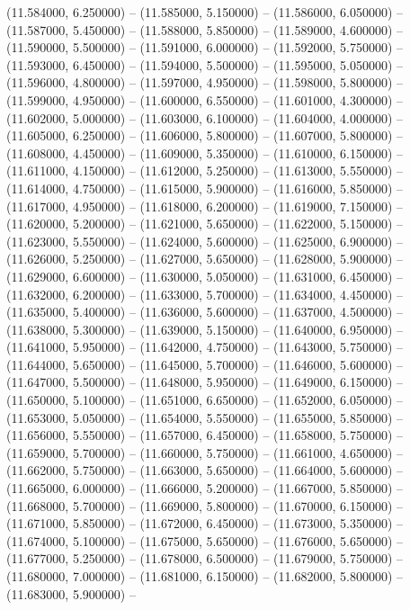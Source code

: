 (11.584000, 6.250000) -- 
(11.585000, 5.150000) -- 
(11.586000, 6.050000) -- 
(11.587000, 5.450000) -- 
(11.588000, 5.850000) -- 
(11.589000, 4.600000) -- 
(11.590000, 5.500000) -- 
(11.591000, 6.000000) -- 
(11.592000, 5.750000) -- 
(11.593000, 6.450000) -- 
(11.594000, 5.500000) -- 
(11.595000, 5.050000) -- 
(11.596000, 4.800000) -- 
(11.597000, 4.950000) -- 
(11.598000, 5.800000) -- 
(11.599000, 4.950000) -- 
(11.600000, 6.550000) -- 
(11.601000, 4.300000) -- 
(11.602000, 5.000000) -- 
(11.603000, 6.100000) -- 
(11.604000, 4.000000) -- 
(11.605000, 6.250000) -- 
(11.606000, 5.800000) -- 
(11.607000, 5.800000) -- 
(11.608000, 4.450000) -- 
(11.609000, 5.350000) -- 
(11.610000, 6.150000) -- 
(11.611000, 4.150000) -- 
(11.612000, 5.250000) -- 
(11.613000, 5.550000) -- 
(11.614000, 4.750000) -- 
(11.615000, 5.900000) -- 
(11.616000, 5.850000) -- 
(11.617000, 4.950000) -- 
(11.618000, 6.200000) -- 
(11.619000, 7.150000) -- 
(11.620000, 5.200000) -- 
(11.621000, 5.650000) -- 
(11.622000, 5.150000) -- 
(11.623000, 5.550000) -- 
(11.624000, 5.600000) -- 
(11.625000, 6.900000) -- 
(11.626000, 5.250000) -- 
(11.627000, 5.650000) -- 
(11.628000, 5.900000) -- 
(11.629000, 6.600000) -- 
(11.630000, 5.050000) -- 
(11.631000, 6.450000) -- 
(11.632000, 6.200000) -- 
(11.633000, 5.700000) -- 
(11.634000, 4.450000) -- 
(11.635000, 5.400000) -- 
(11.636000, 5.600000) -- 
(11.637000, 4.500000) -- 
(11.638000, 5.300000) -- 
(11.639000, 5.150000) -- 
(11.640000, 6.950000) -- 
(11.641000, 5.950000) -- 
(11.642000, 4.750000) -- 
(11.643000, 5.750000) -- 
(11.644000, 5.650000) -- 
(11.645000, 5.700000) -- 
(11.646000, 5.600000) -- 
(11.647000, 5.500000) -- 
(11.648000, 5.950000) -- 
(11.649000, 6.150000) -- 
(11.650000, 5.100000) -- 
(11.651000, 6.650000) -- 
(11.652000, 6.050000) -- 
(11.653000, 5.050000) -- 
(11.654000, 5.550000) -- 
(11.655000, 5.850000) -- 
(11.656000, 5.550000) -- 
(11.657000, 6.450000) -- 
(11.658000, 5.750000) -- 
(11.659000, 5.700000) -- 
(11.660000, 5.750000) -- 
(11.661000, 4.650000) -- 
(11.662000, 5.750000) -- 
(11.663000, 5.650000) -- 
(11.664000, 5.600000) -- 
(11.665000, 6.000000) -- 
(11.666000, 5.200000) -- 
(11.667000, 5.850000) -- 
(11.668000, 5.700000) -- 
(11.669000, 5.800000) -- 
(11.670000, 6.150000) -- 
(11.671000, 5.850000) -- 
(11.672000, 6.450000) -- 
(11.673000, 5.350000) -- 
(11.674000, 5.100000) -- 
(11.675000, 5.650000) -- 
(11.676000, 5.650000) -- 
(11.677000, 5.250000) -- 
(11.678000, 6.500000) -- 
(11.679000, 5.750000) -- 
(11.680000, 7.000000) -- 
(11.681000, 6.150000) -- 
(11.682000, 5.800000) -- 
(11.683000, 5.900000) -- 
